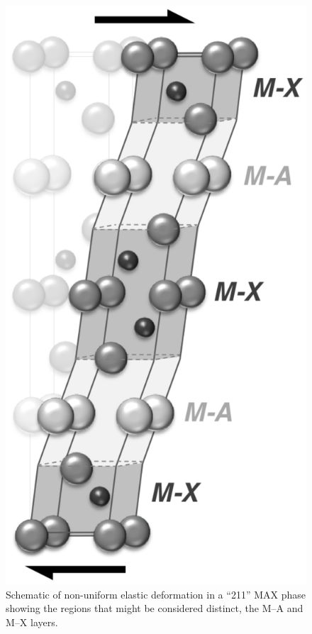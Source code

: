 \begin{figure}
\centering
{}
\includegraphics[height=0.3\textheight]{slab_model}
\caption[Hetergeneous strain in a sheared MAX phase unit cell.]{Schematic of non-uniform elastic deformation in a ``211'' MAX phase showing the regions that might be considered distinct, the M--A and M--X layers.\label{fig:slab_model}}
\end{figure}



